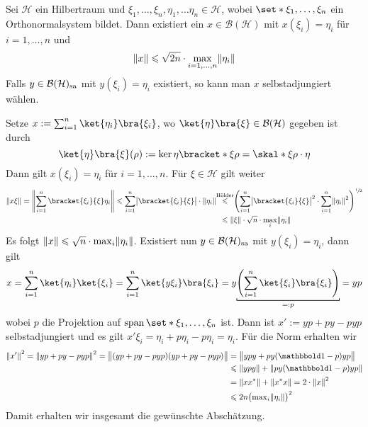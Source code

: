 \begin{proposition}[label=prop:715]
	Sei $\mathcal{H}$ ein Hilbertraum und $\xi_1,\ldots ,\xi_n,\eta_1 ,\ldots \eta_n \in \mathcal{H}$, wobei $\set*{\xi_1, \ldots ,\xi_n}$ ein Orthonormalsystem bildet.
	Dann existiert ein $x \in \mathcal{B}(\mathcal{H})$ mit $x(\xi_i)=\eta_i$ für $i=1,\ldots,n$ und 
	\[
		\norm*{x} \le \sqrt{2n} \cdot \max_{i=1,\ldots ,n} \norm*{\eta_i}
	\]
	Falls $y \in \mathcal{B}(\mathcal{H})_{\mathrm{sa}}$ mit $y(\xi_i)=\eta_i$ existiert, so kann man $x$ selbstadjungiert wählen.
\end{proposition}
\begin{beweis}
	Setze $x := \sum_{i=1}^{n} \ket{\eta_i} \bra{\xi_i}$, wo $\ket{\eta} \bra{\xi} \in \mathcal{B}(\mathcal{H})$ gegeben ist durch
	\[
		\ket{\eta} \bra{\xi} (\rho) := \ker{\eta} \bracket*{\xi}{\rho} = \skal*{\xi}{\rho} \cdot \eta
	\]
	Dann gilt $x(\xi_i) = \eta_i$ für $i=1,\ldots ,n$.
	Für $\xi \in \mathcal{H}$ gilt weiter 
	\begin{align}
		\norm*{x \xi} = \norm*{\sum_{i=1}^{n} \bracket{\xi_i}{\xi} \eta_i} \le \sum_{i=1}^{n} \abs[\big]{ \bracket{\xi_i}{\xi}} \cdot \norm*{\eta_i}\enspace &\StackTextClap{Hölder}{\le}\enspace \enbrace*{\sum_{i=1}^{n} \abs[\big]{\bracket{\xi_i}{\xi}}^2 \cdot \sum_{i=1}^{n} \norm*{\eta_i}^2}^{\sfrac{1}{2}}\\
		&\le \norm*{\xi} \cdot \sqrt{n} \cdot \max_i \norm*{\eta_i}
	\end{align}
	Es folgt $\norm*{x} \le \sqrt{n} \cdot \max_i \norm*{\eta_i}$.
	Existiert nun $y \in \mathcal{B}(\mathcal{H})_{\mathrm{sa}}$ mit $y(\xi_i) =\eta_i$, dann gilt
	\[
		x = \sum_{i=1}^{n} \ket{\eta_i} \ket{\xi_i} = \sum_{i=1}^{n} \ket{y \xi_i} \bra{\xi_i} = y \Underbracket{\enbrace*{\sum_{i=1}^{n} \ket{\xi_i} \bra{\xi_i}}}{=:p} =y p
	\]
	wobei $p$ die Projektion auf $\Span \set*{\xi_1, \ldots ,\xi_n}$ ist. 
	Dann ist $x' := yp + py - pyp$ selbstadjungiert und es gilt $x' \xi_i = \eta_i + p \eta_i - p \eta_i=\eta_i$.
	Für die Norm erhalten wir
	\begin{align}
		\norm*{x'}^2 = \norm*{yp + py - pyp}^2 = \norm[\big]{ \enbrace*{yp+py-pyp} \enbrace*{yp + py - pyp}}&= \norm[\big]{ypy + py(\ind -p) yp} \\
		&\le \norm*{ypy} + \norm*{py(\ind-p)yp} \\
		&= \norm*{xx^*} + \norm*{x^*x} = 2 \cdot \norm*{x}^2 \\
		&\le 2 n \enbrace[\big]{\max\nolimits_i \norm*{\eta_i}}^2
	\end{align}
	Damit erhalten wir insgesamt die gewünschte Abschätzung.
\end{beweis}

